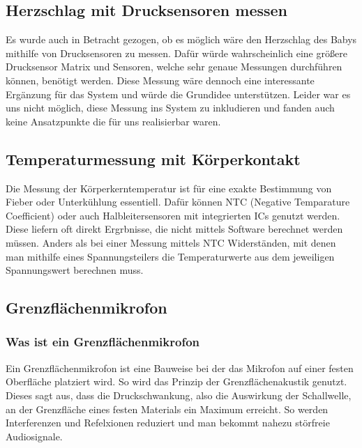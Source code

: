 \subsection[Herzschlag mit Drucksensoren messen]{Herzschlag mit Drucksensoren messen\authorlinda} \label{Herzschlag-Drucksensoren}
Es wurde auch in Betracht gezogen, ob es möglich wäre den Herzschlag des Babys mithilfe von Drucksensoren zu messen. Dafür würde wahrscheinlich eine größere Drucksensor Matrix und Sensoren,
welche sehr genaue Messungen durchführen können, benötigt werden. Diese Messung wäre dennoch eine interessante Ergänzung für das System
und würde die Grundidee unterstützen. Leider war es uns nicht möglich, diese Messung ins System zu inkludieren und fanden auch keine Ansatzpunkte die für uns realisierbar waren. 

\subsection[Temperaturmessung mit Körperkontakt]{Temperaturmessung mit Körperkontakt\authorkatrin} \label{Temperaturmessung mit Körperkonkakt}
Die Messung der Körperkerntemperatur ist für eine exakte Bestimmung von Fieber oder Unterkühlung essentiell. Dafür können NTC (Negative Temparature Coefficient)
oder auch Halbleitersensoren mit integrierten ICs genutzt werden. Diese liefern oft direkt Ergrbnisse, die nicht mittels Software berechnet werden müssen. 
Anders als bei einer Messung mittels NTC Widerständen, mit denen man mithilfe eines Spannungsteilers die Temperaturwerte aus dem jeweiligen 
Spannungswert berechnen muss.

\subsection[Grenzflächenmikrofon]{Grenzflächenmikrofon\authorkatrin} \label{grenzflächenmic}
\subsubsection{Was ist ein Grenzflächenmikrofon}
Ein Grenzflächenmikrofon ist eine Bauweise bei der das Mikrofon auf einer festen Oberfläche platziert wird. So wird das Prinzip
der Grenzflächenakustik genutzt. Dieses sagt aus, dass die Druckschwankung, also die Auswirkung der Schallwelle, an der Grenzfläche eines
festen Materials ein Maximum erreicht. So werden Interferenzen und Refelxionen reduziert und man bekommt nahezu störfreie 
Audiosignale. \cite{grenzflaechenmikrofon_wikipedia}
